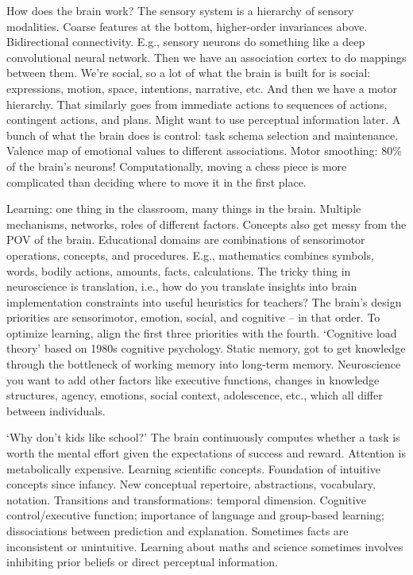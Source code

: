 How does the brain work?
The sensory system is a hierarchy of sensory modalities.
Coarse features at the bottom, higher-order invariances above.
Bidirectional connectivity.
E.g., sensory neurons do something like a deep convolutional neural network.
Then we have an association cortex to do mappings between them.
We're social, so a lot of what the brain is built for is social: expressions, motion,
space, intentions, narrative, etc. And then we have a motor hierarchy.
That similarly goes from immediate actions to sequences of actions, contingent actions,
and plans.
Might want to use perceptual information later.
A bunch of what the brain does is control: task schema selection and maintenance.
Valence map of emotional values to different associations.
Motor smoothing: 80\% of the brain's neurons!
Computationally, moving a chess piece is more complicated than deciding where to move
it in the first place.

Learning: one thing in the classroom, many things in the brain.
Multiple mechanisms, networks, roles of different factors.
Concepts also get messy from the POV of the brain.
Educational domains are combinations of sensorimotor operations, concepts, and
procedures.
E.g., mathematics combines symbols, words, bodily actions, amounts, facts,
calculations.
The tricky thing in neuroscience is translation, i.e., how do you translate insights
into brain implementation constraints into useful heuristics for teachers?
The brain's design priorities are sensorimotor, emotion, social, and cognitive -- in
that order.
To optimize learning, align the first three priorities with the fourth.
`Cognitive load theory' based on 1980s cognitive psychology.
Static memory, got to get knowledge through the bottleneck of working memory into
long-term memory.
Neuroscience you want to add other factors like executive functions, changes in
knowledge structures, agency, emotions, social context, adolescence, etc., which all
differ between individuals.

`Why don't kids like school?'
The brain continuously computes whether a task is worth the mental effort given the
expectations of success and reward.
Attention is metabolically expensive.
Learning scientific concepts.
Foundation of intuitive concepts since infancy.
New conceptual repertoire, abstractions, vocabulary, notation.
Transitions and transformations: temporal dimension.
Cognitive control/executive function; importance of language and group-based learning;
dissociations between prediction and explanation.
Sometimes facts are inconsistent or unintuitive.
Learning about maths and science sometimes involves inhibiting prior beliefs or direct
perceptual information.

